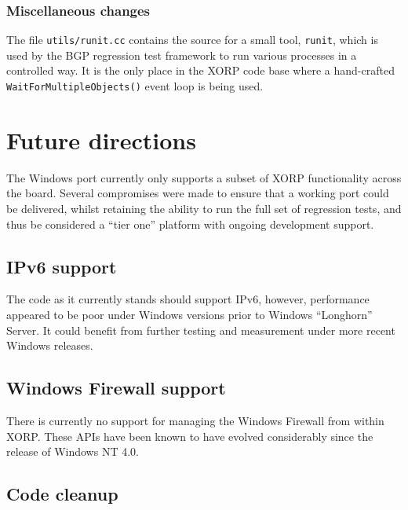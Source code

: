 \documentclass[11pt]{article}
\begin{document}
{%
\subsubsection{Miscellaneous changes}

The file {\tt utils/runit.cc} contains the source for a small tool, {\tt runit},
which is used by the
BGP regression test framework to run various processes in a controlled way.
It is the only place in the XORP code base where a hand-crafted
{\tt WaitForMultipleObjects()} event loop is being used.


\section{Future directions}

The Windows port currently only supports a subset of XORP functionality across
the board. Several compromises were made to ensure that a working port
could be delivered, whilst retaining the ability to run the full set
of regression tests, and thus be considered a ``tier one'' platform
with ongoing development support.

\subsection{IPv6 support}

The code as it currently stands should support IPv6, however, performance
appeared to be poor under Windows versions prior to
Windows ``Longhorn'' Server.
It could benefit from further testing and measurement under more recent
Windows releases.

\subsection{Windows Firewall support}

There is currently no support for managing the Windows Firewall from
within XORP. These APIs have been known to have evolved considerably
since the release of Windows NT 4.0.

\subsection{Code cleanup}

}
\end{document}
